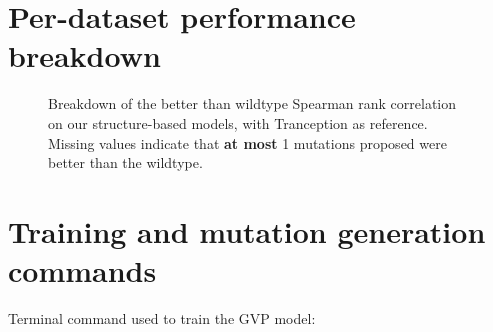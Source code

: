 \documentclass[12pt,a4paper]{report}
\begin{document}
\clearpage


\section{Per-dataset performance breakdown}
\label{appendix:per-dataset-breakdown}
\begin{figure}[!h]
    \centering
    \vspace{1cm}
    \caption{Breakdown of the better than wildtype Spearman rank correlation on our structure-based models, with Tranception as reference. Missing values indicate that \textbf{at most} 1 mutations proposed were better than the wildtype.}
    \label{per-dataset-breakdown}
\end{figure}
\clearpage
\section{Training and mutation generation commands}
Terminal command used to train the GVP model:
\end{document}
